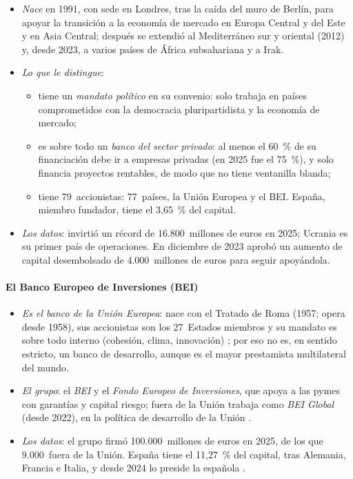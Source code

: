 \documentclass[11pt]{article}
\begin{document}
\begin{itemize}
\item \emph{Nace} en 1991, con sede en Londres, tras la caída del muro de Berlín, para apoyar la transición a la economía de mercado en Europa Central y del Este y en Asia Central; después se extendió al Mediterráneo sur y oriental (2012) y, desde 2023, a varios países de África subsahariana y a Irak.
\item \emph{Lo que le distingue}:
  \begin{itemize}
  \item tiene un \emph{mandato político} en su convenio: solo trabaja en países comprometidos con la democracia pluripartidista y la economía de mercado;
  \item es sobre todo un \emph{banco del sector privado}: al menos el 60~\% de su financiación debe ir a empresas privadas (en 2025 fue el 75~\%), y solo financia proyectos rentables, de modo que no tiene ventanilla blanda;
  \item tiene 79~accionistas: 77~países, la Unión Europea y el BEI. España, miembro fundador, tiene el 3,65~\% del capital\nocite{BERD2025Espana}.
  \end{itemize}
\item \emph{Los datos}: invirtió un récord de 16.800~millones de euros en 2025; Ucrania es su primer país de operaciones. En diciembre de 2023 aprobó un aumento de capital desembolsado de 4.000~millones de euros para seguir apoyándola\nocite{BERD2026Record}.
\end{itemize}

\paragraph{El Banco Europeo de Inversiones (BEI)}\label{sec:bei}

\begin{itemize}
\item \emph{Es el banco de la Unión Europea}: nace con el Tratado de Roma (1957; opera desde 1958), sus accionistas son los 27~Estados miembros y su mandato es sobre todo interno (cohesión, clima, innovación) ; por eso no es, en sentido estricto, un banco de desarrollo, aunque es el mayor prestamista multilateral del mundo.
\item \emph{El grupo}: el \emph{BEI} y el \emph{Fondo Europeo de Inversiones}, que apoya a las pymes con garantías y capital riesgo; fuera de la Unión trabaja como \emph{BEI Global} (desde 2022), en la política de desarrollo de la Unión .
\item \emph{Los datos}: el grupo firmó 100.000~millones de euros en 2025, de los que 9.000~fuera de la Unión\nocite{BEI2026Resultados}. España tiene el 11,27~\% del capital, tras Alemania, Francia e Italia, y desde 2024 lo preside la española \nocite{BEI2025Informe}.
\end{itemize}
\end{document}
